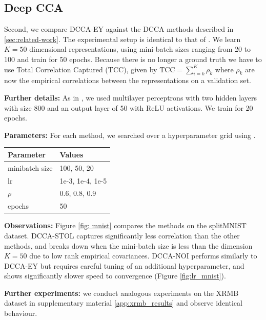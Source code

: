 \subsection{Deep CCA}\label{sec:experiments-DCCA}
Second, we compare DCCA-EY against the DCCA methods described in \cref{sec:related-work}. The experimental setup is identical to that of \cite{wang2015stochastic}.
We learn $K=50$ dimensional representations, using mini-batch sizes ranging from 20 to 100 and train for 50 epochs.
Because there is no longer a ground truth we have to use Total Correlation Captured (TCC), given by \( \text{TCC} = \sum_{i=k}^K \rho_k \) where $\rho_k$ are now the empirical correlations between the representations on a validation set.

\textbf{Further details:} As in \citet{wang2015stochastic}, we used multilayer perceptrons with two hidden layers with size 800 and an output layer of 50 with ReLU activations. We train for 20 epochs.

\textbf{Parameters:} For each method, we searched over a hyperparameter grid using \citet{wandb}.

\begin{table}[h!] 
\centering 
\begin{tabular}{|l|l|} 
\hline Parameter & Values \\
\hline minibatch size & 100, 50, 20 \\ 
\hline lr & 1e-3, 1e-4, 1e-5 \\ 
\hline $\rho$\footnotemark & 0.6, 0.8, 0.9 \\ 
\hline epochs & 50 \\ 
\hline 
\end{tabular}
\end{table}

\textbf{Observations:}
Figure \ref{fig: mnist} compares the methods on the splitMNIST dataset.
DCCA-STOL captures significantly less correlation than the other methods, and breaks down when the mini-batch size is less than the dimension $K=50$ due to low rank empirical covariances.
DCCA-NOI performs similarly to DCCA-EY but requires careful tuning of an additional hyperparameter, and shows significantly slower speed to convergence (Figure \ref{fig:lr_mnist}).

\textbf{Further experiments:} we conduct analogous experiments on the XRMB dataset in supplementary material \ref{app:xrmb_results} and observe identical behaviour.

